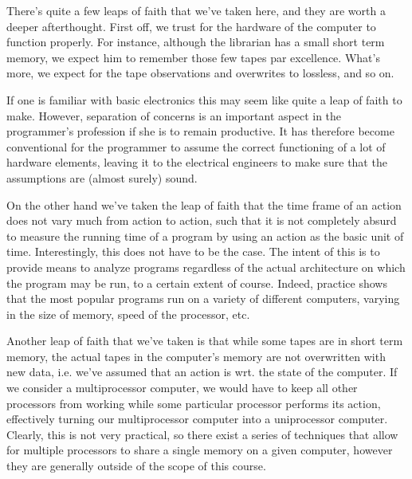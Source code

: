 
There's quite a few leaps of faith that we've taken here, and they are worth a
deeper afterthought. First off, we trust for the hardware of the computer to
function properly. For instance, although the librarian has a small short term
memory, we expect him to remember those few tapes par excellence. What's more,
we expect for the tape observations and overwrites to lossless, and so on.

If one is familiar with basic electronics this may seem like quite a leap of
faith to make. However, separation of concerns is an important aspect in the
programmer's profession if she is to remain productive. It has therefore become
conventional for the programmer to assume the correct functioning of a lot of
hardware elements, leaving it to the electrical engineers to make sure that the
assumptions are (almost surely) sound.

On the other hand we've taken the leap of faith that the time frame of an
action does not vary much from action to action, such that it is not completely
absurd to measure the running time of a program by using an action as the basic
unit of time. Interestingly, this does not have to be the case. The intent of
this is to provide means to analyze programs regardless of the actual
architecture on which the program may be run, to a certain extent of course.
Indeed, practice shows that the most popular programs run on a variety of
different computers, varying in the size of memory, speed of the processor,
etc.

Another leap of faith that we've taken is that while some tapes are in short
term memory, the actual tapes in the computer's memory are not overwritten with
new data, i.e. we've assumed that an action is  wrt. the state of
the computer. If we consider a multiprocessor computer, we would have to keep
all other processors from working while some particular processor performs its
action, effectively turning our multiprocessor computer into a uniprocessor
computer. Clearly, this is not very practical, so there exist a series of
techniques that allow for multiple processors to share a single memory on a
given computer, however they are generally outside of the scope of this course.

